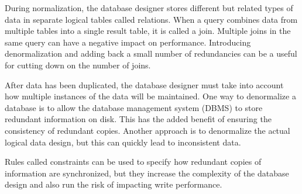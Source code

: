 \documentclass[12pt, a4paper]{report}
\theoremstyle{plain}
\theoremstyle{definition}
\theoremstyle{remark}
\begin{document}
During normalization, the database designer stores different but related types of data in separate logical tables called relations. When a query combines data from multiple tables into a single result table, it is called a join. Multiple joins in the same query can have a negative impact on performance. Introducing denormalization and adding back a small number of redundancies can be a useful for cutting down on the number of joins.

After data has been duplicated, the database designer must take into account how multiple instances of the data will be maintained. One way to denormalize a database is to allow the database management system (DBMS) to store redundant information on disk. This has the added benefit of ensuring the consistency of redundant copies. Another approach is to denormalize the actual logical data design, but this can quickly lead to inconsistent data. 

Rules called constraints can be used to specify how redundant copies of information are synchronized, but they increase the complexity of the database design and also run the risk of impacting write performance.




%
\end{document}
